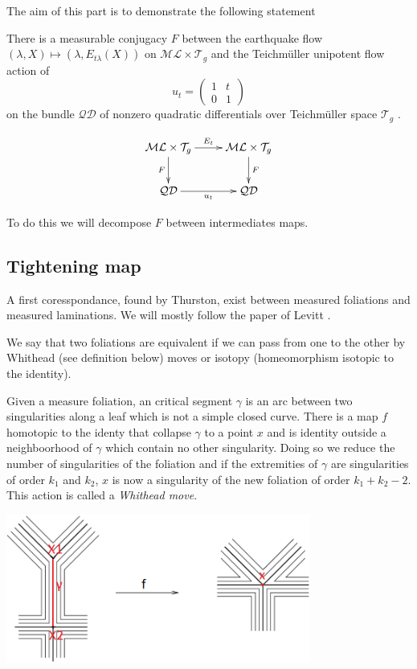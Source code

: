 The aim of this part is to demonstrate the following statement

\begin{thm}
\label{MirThm}
There is a measurable conjugacy $F$ between the earthquake flow $(\lambda , X) \mapsto (\lambda, E_{t \lambda}(X))$ on $\mathcal{ML}\times \mathcal{T}_g $ and the Teichmüller unipotent flow action of \[
u_t = \begin{pmatrix} 1 & t \\ 0 & 1 \end{pmatrix}
\]
on the bundle $\mathcal{QD}$ of nonzero quadratic differentials over Teichmüller space $\mathcal{T}_g$ .
\end{thm}

\[
\xymatrix{
  \mathcal{ML}\times \mathcal{T}_g  \ar[r]^{E_t} \ar[d]_F  & \mathcal{ML}\times \mathcal{T}_g \ar[d]^F \\
   \mathcal{QD} \ar[r]_{u_t} & \mathcal{QD}
 }
\]

To do this we will decompose $F$ between intermediates maps.

\subsection{Tightening map}

A first coresspondance, found by Thurston, exist between measured foliations and measured laminations. We will mostly follow the paper of Levitt \cite{levittfoliations}.

\begin{dfnt}
We say that two foliations are equivalent if we can pass from one to the other by Whithead (see definition below) moves or isotopy (homeomorphism isotopic to the identity).
\end{dfnt}


\begin{dfnt}
Given a measure foliation, an critical segment $\gamma$ is an arc between two singularities along a leaf which is not a simple closed curve.
There is a map $f$ homotopic to the identy that collapse $\gamma$ to a point $x$ and is identity outside a neighboorhood of $\gamma$ which contain no other singularity. Doing so we reduce the number of singularities of the foliation and if the extremities of $\gamma$ are singularities of order $k_1$ and $k_2$, $x$ is now a singularity of the new foliation of order $k_1+k_2-2$.
This action is called a \emph{Whithead move}.
\end{dfnt}


\begin{center}
\includegraphics[width=10cm]{Image/Whitehead-move-collapsing-or-creating-an-arc-joining-two-singular-points.png}
\end{center}


